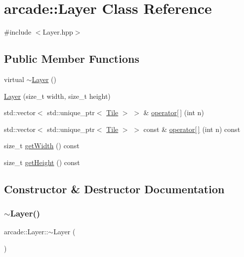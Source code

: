 \hypertarget{classarcade_1_1_layer}{}\section{arcade\+:\+:Layer Class Reference}
\label{classarcade_1_1_layer}


{\ttfamily \#include $<$Layer.\+hpp$>$}

\subsection*{Public Member Functions}
\begin{DoxyCompactItemize}
\item 
virtual \hyperlink{classarcade_1_1_layer_ac24d42c242ff1c91282241f1d275828e}{$\sim$\+Layer} ()
\item 
\hyperlink{classarcade_1_1_layer_aca1a2c1f3ceff974a94e939fee334284}{Layer} (size\+\_\+t width, size\+\_\+t height)
\item 
std\+::vector$<$ std\+::unique\+\_\+ptr$<$ \hyperlink{classarcade_1_1_tile}{Tile} $>$ $>$ \& \hyperlink{classarcade_1_1_layer_a3d1c757621d4d14c7b4196c7ced76f5f}{operator\mbox{[}$\,$\mbox{]}} (int n)
\item 
std\+::vector$<$ std\+::unique\+\_\+ptr$<$ \hyperlink{classarcade_1_1_tile}{Tile} $>$ $>$ const  \& \hyperlink{classarcade_1_1_layer_a9067055ced1434f349f17767d77a9e6d}{operator\mbox{[}$\,$\mbox{]}} (int n) const
\item 
size\+\_\+t \hyperlink{classarcade_1_1_layer_a7af02d2e8135051c02897f27f83d09a5}{get\+Width} () const
\item 
size\+\_\+t \hyperlink{classarcade_1_1_layer_aa85bc4c2149a930c12ce17659de5e962}{get\+Height} () const
\end{DoxyCompactItemize}


\subsection{Constructor \& Destructor Documentation}
\mbox{\label{classarcade_1_1_layer_ac24d42c242ff1c91282241f1d275828e}} 
\subsubsection{\texorpdfstring{$\sim$\+Layer()}{~Layer()}}
{\footnotesize\ttfamily arcade\+::\+Layer\+::$\sim$\+Layer (\begin{DoxyParamCaption}{ }\end{DoxyParamCaption})\hspace{0.3cm}{\ttfamily [virtual]}}

